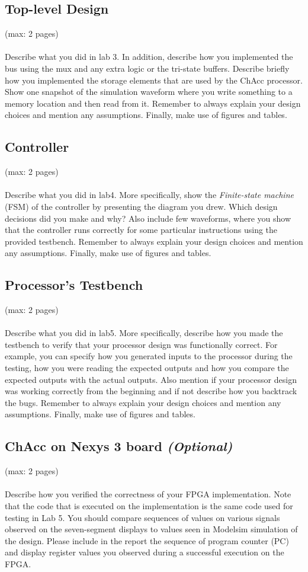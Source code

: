 \documentclass[a4paper,11pt]{article}
\begin{document}
\subsection{Top-level Design}
(max: 2 pages)
\\\\
Describe what you did in lab 3. In addition, describe how you implemented the bus using the mux and any extra logic or the tri-state buffers. Describe briefly how you implemented the storage elements that are used by the ChAcc processor. Show one snapshot of the simulation waveform where you write something to a memory location and then read from it. Remember to always explain your design choices and mention any assumptions. Finally, make use of figures and tables. 

\subsection{Controller}
(max: 2 pages)
\\\\
Describe what you did in lab4. More specifically, show the \emph{Finite-state machine} (FSM) of the controller by presenting the diagram you drew. Which design decisions did you make and why? Also include few waveforms, where you show that the controller runs correctly for some particular instructions using the provided testbench. Remember to always explain your design choices and mention any assumptions. Finally, make use of figures and tables. 

\subsection{Processor's Testbench}
(max: 2 pages)
\\\\
Describe what you did in lab5. More specifically, describe how you made the testbench to verify that your processor design was functionally correct. For example, you can specify how you generated inputs to the processor during the testing, how you were reading the expected outputs and how you compare the expected outputs with the actual outputs. Also mention if your processor design was working correctly from the beginning and if not describe how you backtrack the bugs. Remember to always explain your design choices and mention any assumptions. Finally, make use of figures and tables. 

\subsection{ChAcc on Nexys 3 board \emph{(Optional)}}
(max: 2 pages)
\\\\
Describe how you verified the correctness of your FPGA implementation. Note that the code that is executed on the implementation is the same code used for testing in Lab 5. You should compare sequences of values on various signals observed on the seven-segment displays to values seen in Modelsim simulation of the design. Please include in the report the sequence of program counter (PC) and display register values you observed during a successful execution on the FPGA. 
\end{document}
